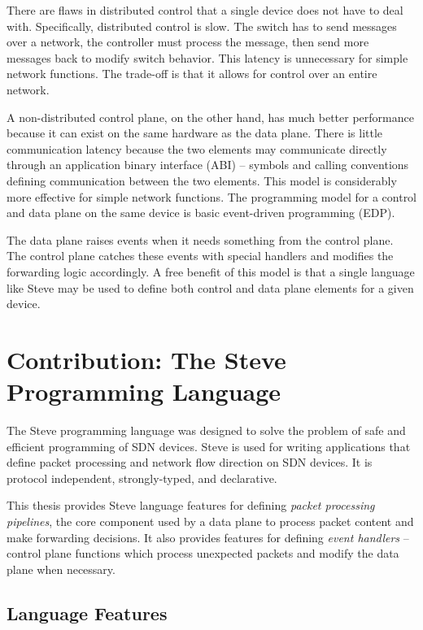 There are flaws in distributed control that a single device does not have to deal with.
Specifically, distributed control is slow.
The switch has to send messages over a network, the controller must process the message, then send more messages back to modify switch behavior. This latency is unnecessary for simple network functions.
The trade-off is that it allows for control over an
entire network.

A non-distributed control plane, on the other hand, has much
better performance because
it can exist on the
same hardware as the data plane. There is little communication latency
because the two elements may communicate directly through an application
binary interface (ABI) -- symbols and calling conventions defining communication between the two elements.
This model is considerably more effective for simple network functions.
The programming model for a control and data plane on the same device
is basic event-driven programming (EDP).

The data plane raises events when it needs something from the control plane.
The control plane catches these events with special handlers and modifies the
forwarding logic accordingly.
A free benefit of this model is that a single language like Steve may
be used to define both control and data plane elements for a given
device.

\section{Contribution: The Steve Programming Language}

The Steve programming language was designed to solve the problem of safe and efficient programming of SDN devices.
Steve is used for writing applications that define packet processing and network flow direction on SDN devices.
It is protocol independent, strongly-typed,
and declarative.

This thesis provides Steve language features 
for defining \emph{packet
processing pipelines}, the core component used by a data plane
to process packet content and make forwarding decisions.
It also provides features for defining \emph{event handlers} --
control plane functions which process unexpected packets and
modify the data plane when necessary.

\subsection{Language Features}

